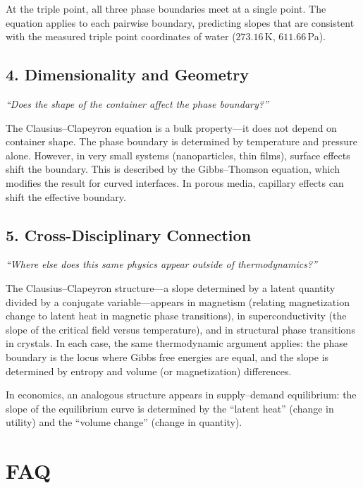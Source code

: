 \documentclass[11pt,openright]{book}
\begin{document}
At the triple point, all three phase boundaries meet at a single point. The equation applies to each pairwise boundary, predicting slopes that are consistent with the measured triple point coordinates of water ($273.16$\,K, $611.66$\,Pa).

\subsection*{4. Dimensionality and Geometry}
\textit{``Does the shape of the container affect the phase boundary?''}

The Clausius--Clapeyron equation is a bulk property---it does not depend on container shape. The phase boundary is determined by temperature and pressure alone. However, in very small systems (nanoparticles, thin films), surface effects shift the boundary. This is described by the Gibbs--Thomson equation, which modifies the result for curved interfaces. In porous media, capillary effects can shift the effective boundary.

\subsection*{5. Cross-Disciplinary Connection}
\textit{``Where else does this same physics appear outside of thermodynamics?''}

The Clausius--Clapeyron structure---a slope determined by a latent quantity divided by a conjugate variable---appears in magnetism (relating magnetization change to latent heat in magnetic phase transitions), in superconductivity (the slope of the critical field versus temperature), and in structural phase transitions in crystals. In each case, the same thermodynamic argument applies: the phase boundary is the locus where Gibbs free energies are equal, and the slope is determined by entropy and volume (or magnetization) differences.

In economics, an analogous structure appears in supply--demand equilibrium: the slope of the equilibrium curve is determined by the ``latent heat'' (change in utility) and the ``volume change'' (change in quantity).


\section*{FAQ}
\end{document}
